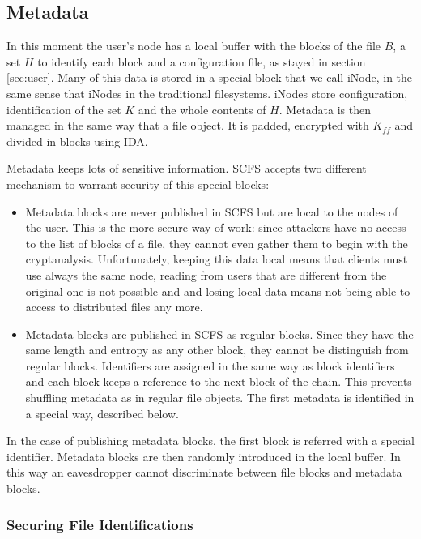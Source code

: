 \documentclass{llncs}
\begin{document}
\subsection{Metadata}

In this moment the user's node has a local buffer with the blocks of the file $B$, a set $H$ to identify each block
and a configuration file, as stayed in section \ref{sec:user}. Many of this data is stored
in a special block that we call iNode, in the same sense that iNodes in the traditional filesystems. iNodes store configuration, identification of the set $K$ and the whole contents of $H$.
Metadata is then managed in the same way that a file object. It is padded, encrypted with $K_{ff}$ and divided in
blocks using IDA.

Metadata keeps lots of sensitive information. SCFS accepts two different mechanism to warrant security
of this special blocks:

\begin{itemize}
 \item Metadata blocks are never published in SCFS but are local to the nodes of the user. This is the
 more secure way of work: since attackers have no access to the list of blocks of a file, they cannot
 even gather them to begin with the cryptanalysis. Unfortunately, keeping this data local means that
 clients must use always the same node, reading from users that are different from the original one is not
 possible and and losing local data means not being able to access to distributed files any more.
 \item Metadata blocks are published in SCFS as regular blocks. Since they have the same length and
 entropy as any other block, they cannot be distinguish from regular blocks. Identifiers are assigned in
 the same way as block identifiers and each block keeps a reference to the next block of the chain. This
 prevents shuffling metadata as in regular file objects. The first metadata is identified in a special way,
 described below.
\end{itemize}

In the case of publishing metadata blocks, the first block is referred with a special identifier. Metadata blocks
are then randomly introduced in the local buffer. In this way an eavesdropper cannot discriminate
between file blocks and metadata blocks.

\subsubsection{Securing File Identifications}
\end{document}
